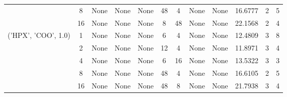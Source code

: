 \begin{tabular}{cccccccccccc}
& 8& None& None& None& 48& 4& None& None& 16.6777& 2& 5\\
& 16& None& None& None& 8& 48& None& None& 22.1568& 2& 4\\
\hline
\multirow{5}{*}{('HPX', 'COO', 1.0)}& 1& None& None& None& 6& 4& None& None& 12.4809& 3& 8\\
& 2& None& None& None& 12& 4& None& None& 11.8971& 3& 4\\
& 4& None& None& None& 6& 16& None& None& 13.5322& 3& 3\\
& 8& None& None& None& 48& 4& None& None& 16.6105& 2& 5\\
& 16& None& None& None& 48& 8& None& None& 21.7938& 3& 4\\
\hline
\end{tabular}



